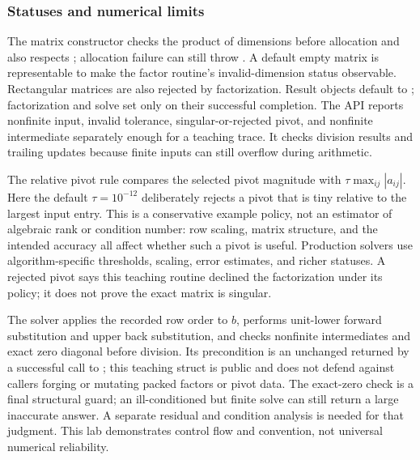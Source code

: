 \subsubsection{Statuses and numerical limits}\label{01-foundations-i-ch019-statuses-and-numerical-limits}

\hypertarget{01-foundations-i-ch019-statuses-and-numerical-limits}{}

The matrix constructor checks the product of dimensions before allocation and also respects ; allocation failure can still throw . A default empty matrix is representable to make the factor routine's invalid-dimension status observable. Rectangular matrices are also rejected by factorization. Result objects default to ; factorization and solve set  only on their successful completion. The API reports nonfinite input, invalid tolerance, singular-or-rejected pivot, and nonfinite intermediate separately enough for a teaching trace. It checks division results and trailing updates because finite inputs can still overflow during arithmetic.

The relative pivot rule compares the selected pivot magnitude with \(\tau\max_{ij}|a_{ij}|\). Here the default \(\tau=10^{-12}\) deliberately rejects a pivot that is tiny relative to the largest input entry. This is a conservative example policy, not an estimator of algebraic rank or condition number: row scaling, matrix structure, and the intended accuracy all affect whether such a pivot is useful. Production solvers use algorithm-specific thresholds, scaling, error estimates, and richer statuses. A rejected pivot says this teaching routine declined the factorization under its policy; it does not prove the exact matrix is singular.

The solver applies the recorded row order to \(b\), performs unit-lower forward substitution and upper back substitution, and checks nonfinite intermediates and exact zero diagonal before division. Its precondition is an unchanged  returned by a successful call to ; this teaching struct is public and does not defend against callers forging or mutating packed factors or pivot data. The exact-zero check is a final structural guard; an ill-conditioned but finite solve can still return a large inaccurate answer. A separate residual and condition analysis is needed for that judgment. This lab demonstrates control flow and convention, not universal numerical reliability.

